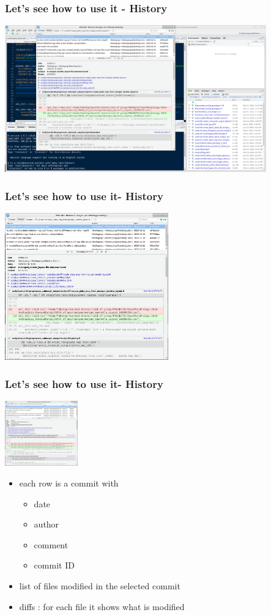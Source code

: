 \documentclass[aspectratio=169]{beamer}
\begin{document}
\begin{frame}
\frametitle<presentation>{Let's see how to use it - History}
\includegraphics[height=180pt]{pictures/Screenshot_2020-02-26_08-38-28-Rstudio-Git-history.png}
\end{frame}

\begin{frame}
\frametitle<presentation>{Let's see how to use it- History}
\includegraphics[height=180pt]{pictures/Screenshot_2020-02-26_08-38-28-Rstudio-Git-history-zoom_in.png}
\end{frame}


\begin{frame}
\frametitle<presentation>{Let's see how to use it- History}
\includegraphics[height=80pt]{pictures/Screenshot_2020-02-26_08-38-28-Rstudio-Git-history-zoom_in.png}

\begin{itemize}
  		\item each row is a commit with
	  		\begin{itemize}
	  		\item date
	  		\item author
			\item comment 
			\item commit ID
			\end{itemize}
  		\item list of files modified in the selected commit 
  		\item diffs : for each file it shows what is modified
	\end{itemize}
\end{frame}
\end{document}
